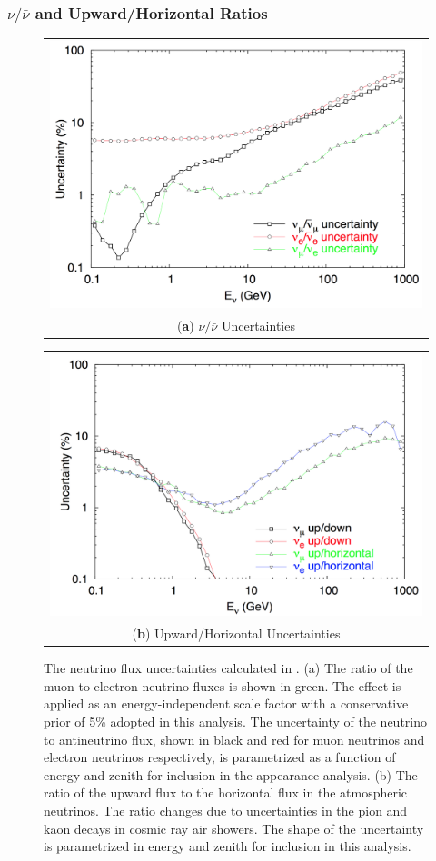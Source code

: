 \subsubsection{$\nu/\bar{\nu}$ and Upward/Horizontal Ratios}
\begin{figure}
\centering
\begin{tabular}[b]{c}
  \includegraphics[width=0.45\linewidth]{systematics/barr_nunubar.png} \\
  \small (\textbf{\color{ctcolormain}a}) $\nu/\bar{\nu}$ Uncertainties
\end{tabular} \hspace{2pt}
\begin{tabular}[b]{c}
  \includegraphics[width=0.45\linewidth]{systematics/barr_uphor.png} \\
  \small (\textbf{\color{ctcolormain}b}) Upward/Horizontal Uncertainties
\end{tabular}
\caption[The neutrino flux shape uncertainties]{The neutrino flux uncertainties calculated in \cite{NuFlux-Barr}. (a) The ratio of the  muon to electron neutrino fluxes is shown in green. The effect is applied as an energy-independent scale factor with a conservative prior of 5\% adopted in this analysis. The uncertainty of the neutrino to antineutrino flux, shown in black and red for muon neutrinos and electron neutrinos respectively, is parametrized as a function of energy and zenith for inclusion in the appearance analysis. (b) The ratio of the upward flux to the horizontal flux in the atmospheric neutrinos. The ratio changes due to uncertainties in the pion and kaon decays in cosmic ray air showers. The shape of the uncertainty is parametrized in energy and zenith for inclusion in this analysis.}
\label{fig:barr_uncertainties}
\end{figure}

